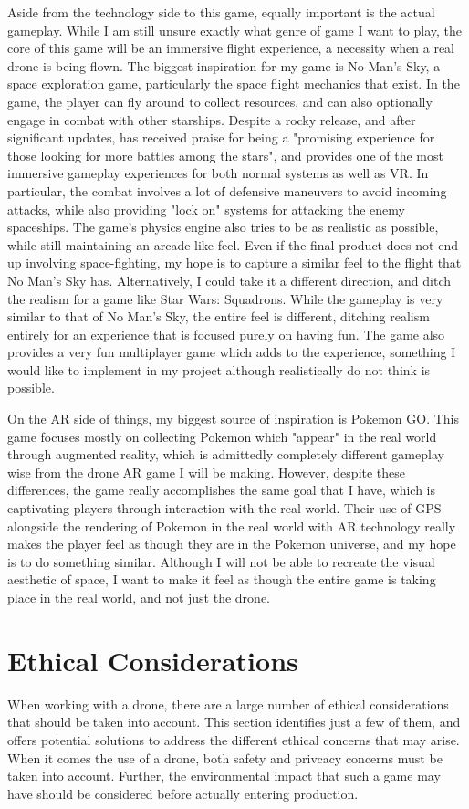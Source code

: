\documentclass[10pt,twocolumn]{article}
\begin{document}
Aside from the technology side to this game, equally important is the actual gameplay. While I am still unsure exactly what genre of game I want to play, the core of this game will be an immersive flight experience, a necessity when a real drone is being flown. The biggest inspiration for my game is No Man's Sky, a space exploration game, particularly the space flight mechanics that exist. In the game, the player can fly around to collect resources, and can also optionally engage in combat with other starships. Despite a rocky release, and after significant updates, has received praise for being a "promising experience for those looking for more battles among the stars", and provides one of the most immersive gameplay experiences for both normal systems as well as VR\cite{NMSOutlaws}. In particular, the combat involves a lot of defensive maneuvers to avoid incoming attacks, while also providing "lock on" systems for attacking the enemy spaceships. The game's physics engine also tries to be as realistic as possible, while still maintaining an arcade-like feel. Even if the final product does not end up involving space-fighting, my hope is to capture a similar feel to the flight that No Man's Sky has. Alternatively, I could take it a different direction, and ditch the realism for a game like Star Wars: Squadrons. While the gameplay is very similar to that of No Man's Sky, the entire feel is different, ditching realism entirely for an experience that is focused purely on having fun. The game also provides a very fun multiplayer game which adds to the experience, something I would like to implement in my project although realistically do not think is possible.

On the AR side of things, my biggest source of inspiration is Pokemon GO. This game focuses mostly on collecting Pokemon which "appear" in the real world through augmented reality, which is admittedly completely different gameplay wise from the drone AR game I will be making. However, despite these differences, the game really accomplishes the same goal that I have, which is captivating players through interaction with the real world. Their use of GPS alongside the rendering of Pokemon in the real world with AR technology really makes the player feel as though they are in the Pokemon universe, and my hope is to do something similar. Although I will not be able to recreate the visual aesthetic of space, I want to make it feel as though the entire game is taking place in the real world, and not just the drone.  


\section{Ethical Considerations}
When working with a drone, there are a large number of ethical considerations that should be taken into account. This section identifies just a few of them, and offers potential solutions to address the different ethical concerns that may arise. When it comes the use of a drone, both safety and privcacy concerns must be taken into account. Further, the environmental impact that such a game may have should be considered before actually entering production.
\end{document}
